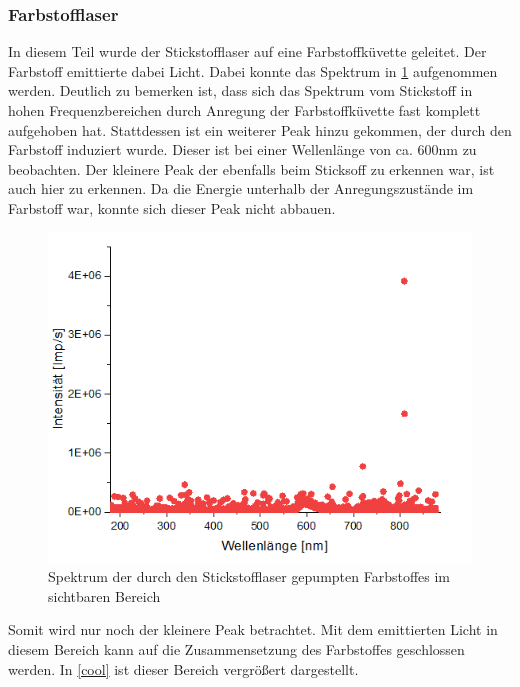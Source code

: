 \documentclass[
	a4paper,
	12pt,
	pagesize,
	ngerman
]{scrartcl}
\begin{document}
\subsubsection{Farbstofflaser}
In diesem Teil wurde der Stickstofflaser auf eine Farbstoffküvette geleitet. Der Farbstoff emittierte dabei Licht. Dabei konnte das Spektrum in \cref{Farbstoff} aufgenommen werden. Deutlich zu bemerken ist, dass sich das Spektrum vom Stickstoff in hohen Frequenzbereichen durch Anregung der Farbstoffküvette fast komplett aufgehoben hat. Stattdessen ist ein weiterer Peak hinzu gekommen, der durch den Farbstoff induziert wurde. Dieser ist bei einer Wellenlänge von ca. 600nm zu beobachten. Der kleinere Peak der ebenfalls beim Sticksoff zu erkennen war, ist auch hier zu erkennen. Da die Energie unterhalb der Anregungszustände im Farbstoff war, konnte sich dieser Peak nicht abbauen. 
\begin{figure}[h!]
	\centering
	\includegraphics[scale = 1.5]{peak.png}
	\caption{Spektrum der durch den Stickstofflaser gepumpten Farbstoffes im sichtbaren Bereich}
	\label{Farbstoff}
\end{figure}
Somit wird nur noch der kleinere Peak betrachtet. Mit dem emittierten Licht in diesem Bereich kann auf die Zusammensetzung des Farbstoffes geschlossen werden. In \cref{cool} ist dieser Bereich vergrößert dargestellt.
\end{document}
